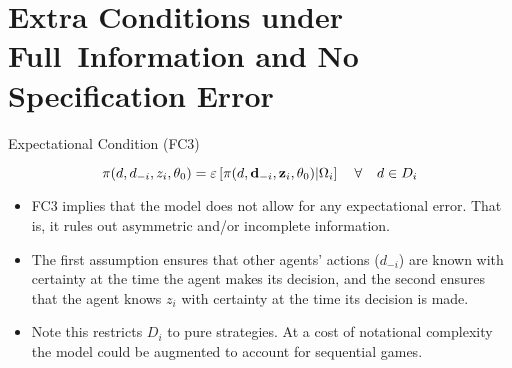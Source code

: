 \section{Extra Conditions under Full\ Information and No Specification Error}
\begin{frame}{Expectational Condition (FC3)}

\begin{equation*}
\pi (d,d_{-i},z_{i},\theta _{0})=\varepsilon \left[ \pi (d,\mathbf{d}%
_{-i},\mathbf{z}_{i},\theta _{0})| \Omega_i \right] \text{ \hspace{0.1in}} \forall  \text{ \hspace{0.1in}} d\in D_{i}
\end{equation*}
\begin{itemize}
\item FC3 implies that the model does not allow for any expectational error. That
is, it rules out asymmetric and/or incomplete information.
\item The first assumption ensures that other agents' actions ($d_{-i}$) are known with certainty at the time
the agent makes its decision, and the second ensures that the agent knows $z_{i}$ with certainty at the time its decision is made. 
\item  Note this restricts $D_i$ to pure strategies.  At a cost of notational complexity the model could be augmented to account for sequential games.
\end{itemize}
\end{frame}

